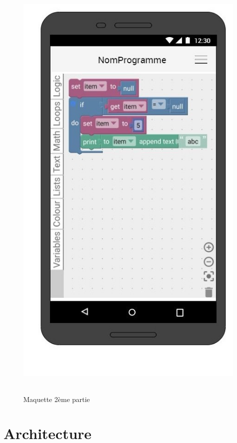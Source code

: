 \documentclass[12pt,francais]{report}
\begin{document}
\begin{figure}[!h]
\begin{addmargin}[6em]{0em}
\includegraphics[scale=0.6]{./images/maquette2.jpg}~\\[1.5cm]
\caption{Maquette 2ème partie}
\label{figMaquette}
\end{addmargin}
\end{figure}



\chapter*{Architecture}
\end{document}
